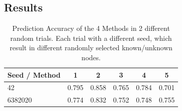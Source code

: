 \documentclass[a4paper,10pt]{article}
\theoremstyle{definition}
\theoremstyle{remark}
\theoremstyle{plain}
\begin{document}
\subsection{Results}

\begin{table}[!htb]
\caption{Prediction Accuracy of the 4 Methods in 2 different random
trials. Each trial with a different seed, which result in different randomly
selected known/unknown nodes.} 
\begin{center}
\begin{tabular}{ | l | c | c | c | c | c | }
\hline
Seed / Method & 1 & 2 & 3 & 4 & 5\\
\hline
42 & 0.795 & 0.858 & 0.765 &
0.784 & 0.701\\
6382020 & 0.774 & 0.832 & 0.752 & 0.748 & 0.755\\
\hline
\end{tabular}
\label{table:results_5_prediction_methods}
\end{center}
\end{table}
\end{document}
